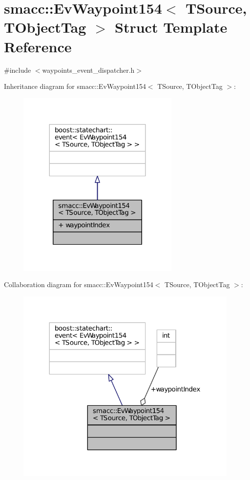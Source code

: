\hypertarget{structsmacc_1_1EvWaypoint154}{}\section{smacc\+:\+:Ev\+Waypoint154$<$ T\+Source, T\+Object\+Tag $>$ Struct Template Reference}
\label{structsmacc_1_1EvWaypoint154}


{\ttfamily \#include $<$waypoints\+\_\+event\+\_\+dispatcher.\+h$>$}



Inheritance diagram for smacc\+:\+:Ev\+Waypoint154$<$ T\+Source, T\+Object\+Tag $>$\+:
\nopagebreak
\begin{figure}[H]
\begin{center}
\leavevmode
\includegraphics[width=227pt]{structsmacc_1_1EvWaypoint154__inherit__graph}
\end{center}
\end{figure}


Collaboration diagram for smacc\+:\+:Ev\+Waypoint154$<$ T\+Source, T\+Object\+Tag $>$\+:
\nopagebreak
\begin{figure}[H]
\begin{center}
\leavevmode
\includegraphics[width=312pt]{structsmacc_1_1EvWaypoint154__coll__graph}
\end{center}
\end{figure}
